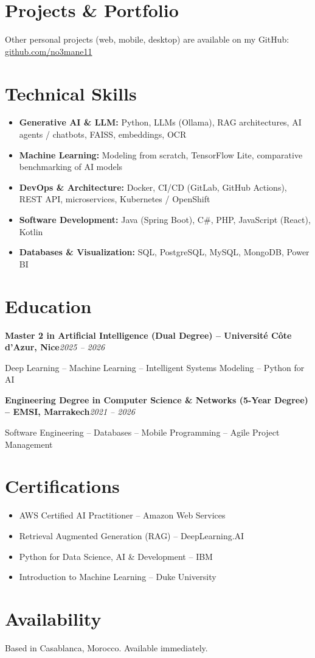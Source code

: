 \documentclass[10pt,a4paper]{article}
\newcommand{\entryheader}[2]{%
  \par\noindent\textbf{#1}\hfill\textit{#2}\par
}
\begin{document}
\section{Projects \& Portfolio}
Other personal projects (web, mobile, desktop) are available on my GitHub: \href{https://github.com/no3mane11}{github.com/no3mane11}
\section{Technical Skills}
\begin{itemize}
  \item \textbf{Generative AI \& LLM:} Python, LLMs (Ollama), RAG architectures, AI agents / chatbots, FAISS, embeddings, OCR
  \item \textbf{Machine Learning:} Modeling from scratch, TensorFlow Lite, comparative benchmarking of AI models
  \item \textbf{DevOps \& Architecture:} Docker, CI/CD (GitLab, GitHub Actions), REST API, microservices, Kubernetes / OpenShift
  \item \textbf{Software Development:} Java (Spring Boot), C\#, PHP, JavaScript (React), Kotlin
  \item \textbf{Databases \& Visualization:} SQL, PostgreSQL, MySQL, MongoDB, Power BI
\end{itemize}
\section{Education}
\entryheader{Master 2 in Artificial Intelligence (Dual Degree) -- Université Côte d'Azur, Nice}{2025 -- 2026}
Deep Learning -- Machine Learning -- Intelligent Systems Modeling -- Python for AI
\entryheader{Engineering Degree in Computer Science \& Networks (5-Year Degree) -- EMSI, Marrakech}{2021 -- 2026}
Software Engineering -- Databases -- Mobile Programming -- Agile Project Management
\section{Certifications}
\begin{itemize}
  \item AWS Certified AI Practitioner -- Amazon Web Services
  \item Retrieval Augmented Generation (RAG) -- DeepLearning.AI
  \item Python for Data Science, AI \& Development -- IBM
  \item Introduction to Machine Learning -- Duke University
\end{itemize}
\section{Availability}
Based in Casablanca, Morocco. Available immediately.
\end{document}
